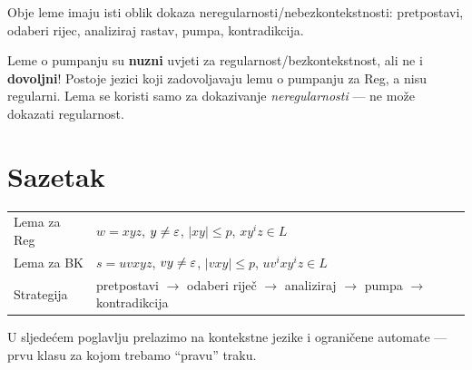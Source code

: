 Obje leme imaju isti oblik dokaza neregularnosti/nebezkontekstnosti:
pretpostavi, odaberi rijec, analiziraj rastav, pumpa, kontradikcija.

\begin{kljucno}
Leme o pumpanju su \textbf{nuzni} uvjeti za regularnost/bezkontekstnost,
ali ne i \textbf{dovoljni}! Postoje jezici koji zadovoljavaju lemu o
pumpanju za Reg, a nisu regularni. Lema se koristi samo za dokazivanje
\emph{neregularnosti} --- ne može dokazati regularnost.
\end{kljucno}

\section*{Sazetak}

\medskip\noindent
\begin{tabular}{ll}
  Lema za Reg & $w = xyz$, $y \neq \varepsilon$, $|xy| \leq p$, $xy^iz \in L$ \\
  Lema za BK  & $s = uvxyz$, $vy \neq \varepsilon$, $|vxy| \leq p$, $uv^ixy^iz \in L$ \\
  Strategija & pretpostavi $\to$ odaberi riječ $\to$ analiziraj $\to$ pumpa $\to$ kontradikcija \\
\end{tabular}

\medskip\noindent
U sljedećem poglavlju prelazimo na kontekstne jezike i ograničene
automate --- prvu klasu za kojom trebamo ``pravu'' traku.

